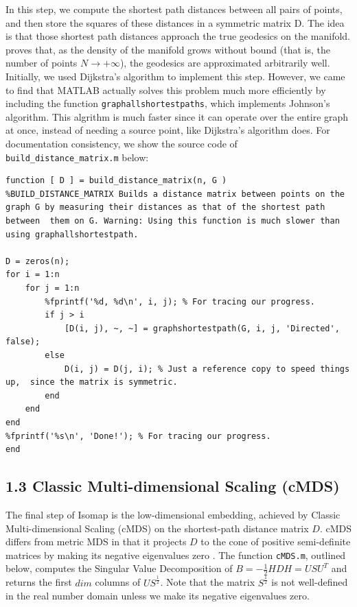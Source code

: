 \documentclass[a4paper,12pt]{report}
\begin{document}
In this step, we compute the shortest path distances between all pairs of points, and then store the squares of these distances in a symmetric matrix D. The idea is that those shortest path distances approach the true geodesics on the manifold. \cite{Tenenbaum2000} proves that, as the density of the manifold grows without bound (that is, the number of points $N \to +\infty$), the geodesics are approximated arbitrarily well.  Initially, we used Dijkstra's algorithm to implement this step. However, we came to find that MATLAB actually solves this problem much more efficiently by including the function \texttt{graphallshortestpaths}, which implements Johnson's algorithm. This algrithm is much faster since it can operate over the entire graph at once, instead of needing a source point, like Dijkstra's algorithm does. For documentation consistency, we show the source code of \texttt{build\_distance\_matrix.m} below:

\vspace{.2in}
\begin{lstlisting}
function [ D ] = build_distance_matrix(n, G )
%BUILD_DISTANCE_MATRIX Builds a distance matrix between points on the graph G by measuring their distances as that of the shortest path between  them on G. Warning: Using this function is much slower than using graphallshortestpath.

D = zeros(n);
for i = 1:n
    for j = 1:n
        %fprintf('%d, %d\n', i, j); % For tracing our progress.
        if j > i
            [D(i, j), ~, ~] = graphshortestpath(G, i, j, 'Directed', false);
        else
            D(i, j) = D(j, i); % Just a reference copy to speed things up,  since the matrix is symmetric.
        end
    end
end
%fprintf('%s\n', 'Done!'); % For tracing our progress.
end
\end{lstlisting}


\subsection*{1.3 Classic Multi-dimensional Scaling (cMDS)}

The final step of Isomap is the low-dimensional embedding, achieved by Classic Multi-dimensional Scaling (cMDS) on the shortest-path distance matrix
$D$. cMDS differs from metric MDS in that it projects $D$ to the cone of positive semi-definite matrices by making its negative eigenvalues zero \cite{Cayton2005}. The function \texttt{cMDS.m}, outlined below, computes the Singular Value Decomposition of $B = -\frac{1}{2}HDH = USU^T$ and returns the first $dim$ columns of $US^{\frac{1}{2}}$. Note that the matrix $S^{\frac{1}{2}}$ is not well-defined in the real number domain unless we make its negative eigenvalues zero.
\end{document}
